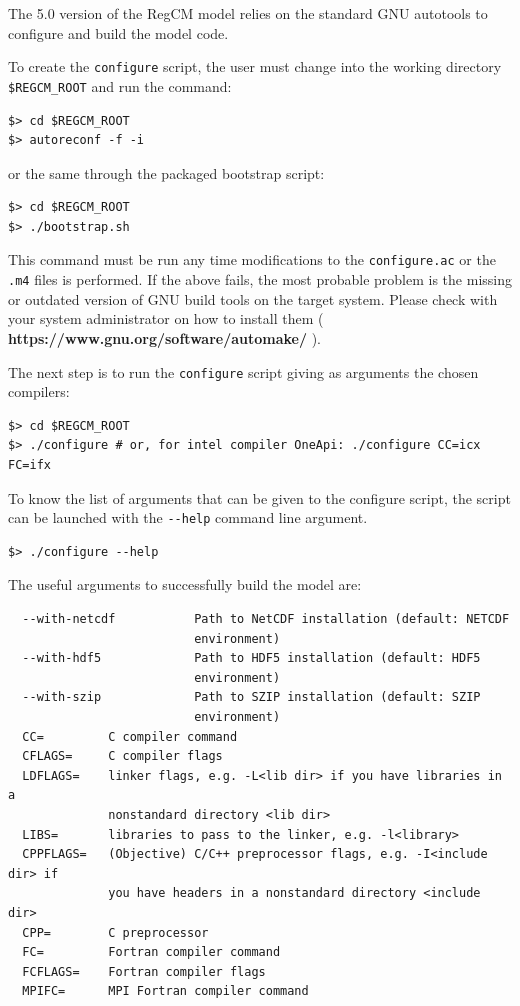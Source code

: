 The 5.0 version of the RegCM model relies on the standard GNU autotools to
configure and build the model code.

To create the \verb=configure= script, the user must change into the 
working directory \verb=$REGCM_ROOT= and run the command:

\begin{Verbatim}
$> cd $REGCM_ROOT
$> autoreconf -f -i
\end{Verbatim}

or the same through the packaged bootstrap script:

\begin{Verbatim}
$> cd $REGCM_ROOT
$> ./bootstrap.sh
\end{Verbatim}

This command must be run any time modifications to the \verb=configure.ac= or
the \verb=.m4= files is performed.
If the above fails, the most probable problem is the missing or outdated
version of GNU build tools on the target system. Please check with your
system administrator on how to install them
({ \bf https://www.gnu.org/software/automake/ }).

The next step is to run the \verb=configure= script giving as arguments the
chosen compilers:

\begin{Verbatim}
$> cd $REGCM_ROOT
$> ./configure # or, for intel compiler OneApi: ./configure CC=icx FC=ifx
\end{Verbatim}

To know the list of arguments that can be given to the configure script, the
script can be launched with the \verb=--help= command line argument.

\begin{Verbatim}
$> ./configure --help
\end{Verbatim}

The useful arguments to successfully build the model are:

\begin{Verbatim}
  --with-netcdf           Path to NetCDF installation (default: NETCDF
                          environment)
  --with-hdf5             Path to HDF5 installation (default: HDF5
                          environment)
  --with-szip             Path to SZIP installation (default: SZIP
                          environment)
  CC=         C compiler command
  CFLAGS=     C compiler flags
  LDFLAGS=    linker flags, e.g. -L<lib dir> if you have libraries in a
              nonstandard directory <lib dir>
  LIBS=       libraries to pass to the linker, e.g. -l<library>
  CPPFLAGS=   (Objective) C/C++ preprocessor flags, e.g. -I<include dir> if
              you have headers in a nonstandard directory <include dir>
  CPP=        C preprocessor
  FC=         Fortran compiler command
  FCFLAGS=    Fortran compiler flags
  MPIFC=      MPI Fortran compiler command
\end{Verbatim}

